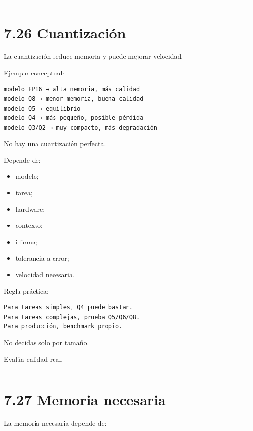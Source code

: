 \begin{center}\rule{0.5\linewidth}{0.5pt}\end{center}

\section{7.26 Cuantización}\label{cuantizaciuxf3n-1}

La cuantización reduce memoria y puede mejorar velocidad.

Ejemplo conceptual:

\begin{lstlisting}
modelo FP16 → alta memoria, más calidad
modelo Q8 → menor memoria, buena calidad
modelo Q5 → equilibrio
modelo Q4 → más pequeño, posible pérdida
modelo Q3/Q2 → muy compacto, más degradación
\end{lstlisting}

No hay una cuantización perfecta.

Depende de:

\begin{itemize}
\tightlist
\item
  modelo;
\item
  tarea;
\item
  hardware;
\item
  contexto;
\item
  idioma;
\item
  tolerancia a error;
\item
  velocidad necesaria.
\end{itemize}

Regla práctica:

\begin{lstlisting}
Para tareas simples, Q4 puede bastar.
Para tareas complejas, prueba Q5/Q6/Q8.
Para producción, benchmark propio.
\end{lstlisting}

No decidas solo por tamaño.

Evalúa calidad real.

\begin{center}\rule{0.5\linewidth}{0.5pt}\end{center}

\section{7.27 Memoria necesaria}\label{memoria-necesaria}

La memoria necesaria depende de:

